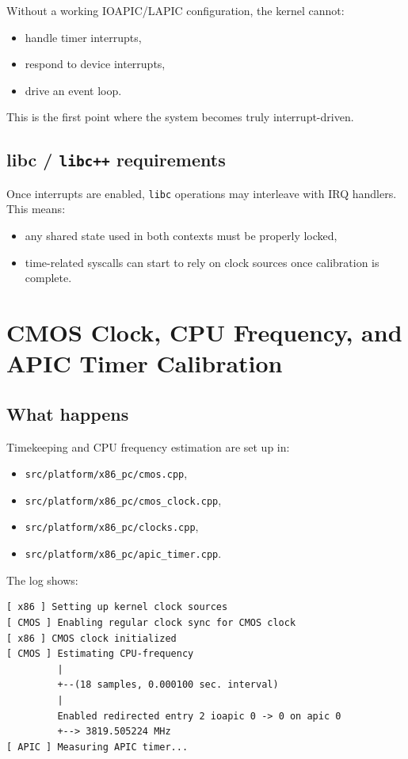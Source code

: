 \documentclass[a4paper,11pt]{article}
\begin{document}
Without a working IOAPIC/LAPIC configuration, the kernel cannot:

\begin{itemize}
  \item handle timer interrupts,
  \item respond to device interrupts,
  \item drive an event loop.
\end{itemize}

This is the first point where the system becomes truly interrupt-driven.

\subsection{libc / \texorpdfstring{\texttt{libc++}}{libc++} requirements}

Once interrupts are enabled, \texttt{libc} operations may interleave with
IRQ handlers. This means:

\begin{itemize}
  \item any shared state used in both contexts must be properly locked,
  \item time-related syscalls can start to rely on clock sources once
        calibration is complete.
\end{itemize}

\section{CMOS Clock, CPU Frequency, and APIC Timer Calibration}

\subsection{What happens}

Timekeeping and CPU frequency estimation are set up in:

\begin{itemize}
  \item \texttt{src/platform/x86\_pc/cmos.cpp},
  \item \texttt{src/platform/x86\_pc/cmos\_clock.cpp},
  \item \texttt{src/platform/x86\_pc/clocks.cpp},
  \item \texttt{src/platform/x86\_pc/apic\_timer.cpp}.
\end{itemize}

The log shows:

\begin{verbatim}
[ x86 ] Setting up kernel clock sources
[ CMOS ] Enabling regular clock sync for CMOS clock
[ x86 ] CMOS clock initialized
[ CMOS ] Estimating CPU-frequency
         |
         +--(18 samples, 0.000100 sec. interval)
         |
         Enabled redirected entry 2 ioapic 0 -> 0 on apic 0
         +--> 3819.505224 MHz
[ APIC ] Measuring APIC timer...
\end{verbatim}
\end{document}
